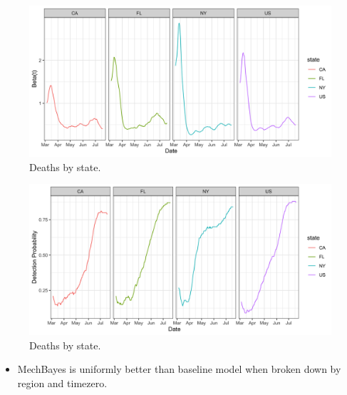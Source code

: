 \documentclass[11pt]{amsart}
\begin{document}
	
 \begin{figure}
     \centering
     \includegraphics[scale=.1]{beta_t_plot.png}
     \caption{Deaths by state. }
     \label{fig:my_label}
 \end{figure}
  \begin{figure}
     \centering
     \includegraphics[scale=.1]{detection_plot.png}
     \caption{Deaths by state. }
     \label{fig:my_label}
 \end{figure}

\begin{itemize}
\item MechBayes is uniformly better than baseline model when broken down by region and timezero.
\end{itemize}   
   
   
   
\end{document}

